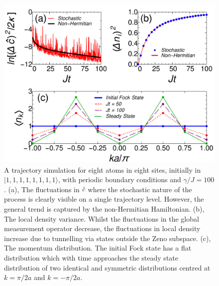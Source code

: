 \begin{figure}[hbtp!]
	\includegraphics[width=\linewidth]{figure3}
	\caption[Non-Hermitian Steady State]{A trajectory simulation
          for eight atoms in eight sites, initially in
          $|1,1,1,1,1,1,1,1 \rangle$, with periodic boundary
          conditions and $\gamma/J = 100$. (a), The fluctuations in
          $\hat{c}$ where the stochastic nature of the process is clearly
          visible on a single trajectory level. However, the general
          trend is captured by the non-Hermitian Hamiltonian. (b), The
          local density variance. Whilst the fluctuations in the
          global measurement operator decrease, the fluctuations in
          local density increase due to tunnelling via states outside
          the Zeno subspace. (c), The momentum distribution. The
          initial Fock state has a flat distribution which with time
          approaches the steady state distribution of two identical
          and symmetric distributions centred at $k = \pi/2a$ and
          $k = -\pi/2a$.\label{fig:steady}}
\end{figure}

